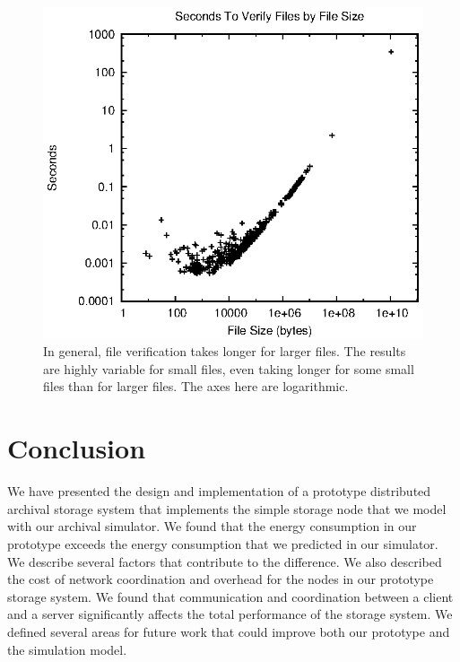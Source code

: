 \begin{figure}[!t]
\includegraphics[width=\linewidth]{fig8.eps}
\caption{In general, file verification takes longer for larger files.  The results are highly variable for small files, even taking longer for some small files than for larger files.  The axes here are logarithmic.}
\label{fig8}
\end{figure}

\section{Conclusion}
We have presented the design and implementation of a prototype distributed archival storage system that implements the simple storage node that we model with our archival simulator.  We found that the energy consumption in our prototype exceeds the energy consumption that we predicted in our simulator.  We describe several factors that contribute to the difference.  We also described the cost of network coordination and overhead for the nodes in our prototype storage system.  We found that communication and coordination between a client and a server significantly affects the total performance of the storage system.  We defined several areas for future work that could improve both our prototype and the simulation model.
